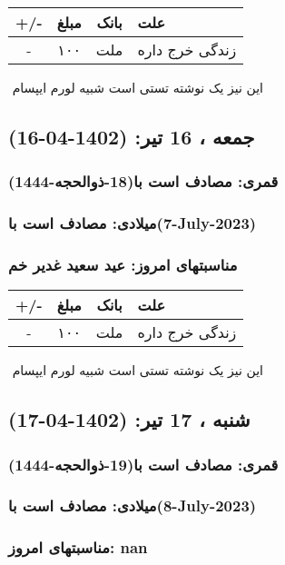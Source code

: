 \documentclass{article}
\newcommand{\rnote}[1]{\marginpar{\textcolor{color}{\StrSubstitute{\##1}{ }{\_}}}}
\newcommand{\myRow}[4]{
    #1 & #2 & #3 & #4 \\ \hline
}
\begin{document}
\begin{tabular}{ | c | c | c | p{5cm} |}
    \hline
    \myRow{ +/- }{مبلغ}{بانک}{علت}
    \myRow{-}{۱۰۰}{ملت}{زندگی خرج داره}
\end{tabular}
\newline
\newline

‌
\rnote{تست}
این نیز یک نوشته تستی است شبیه لورم ایپسام




\newpage
{}
\textcolor{color}{
\section{ جمعه ، 16 تیر: (1402-04-16) }
\subsubsection*{قمری: مصادف است با(18-ذوالحجه-1444)} 
\subsubsection*{میلادی: مصادف است با(7-July-2023)}
\subsubsection*{مناسبتهای امروز: عید سعید غدیر خم}
}


\begin{tabular}{ | c | c | c | p{5cm} |}
    \hline
    \myRow{ +/- }{مبلغ}{بانک}{علت}
    \myRow{-}{۱۰۰}{ملت}{زندگی خرج داره}
\end{tabular}
\newline
\newline

‌
\rnote{تست}
این نیز یک نوشته تستی است شبیه لورم ایپسام




\newpage
{}
\textcolor{color}{
\section{ شنبه ، 17 تیر: (1402-04-17) }
\subsubsection*{قمری: مصادف است با(19-ذوالحجه-1444)} 
\subsubsection*{میلادی: مصادف است با(8-July-2023)}
\subsubsection*{مناسبتهای امروز: nan}
}
\end{document}
